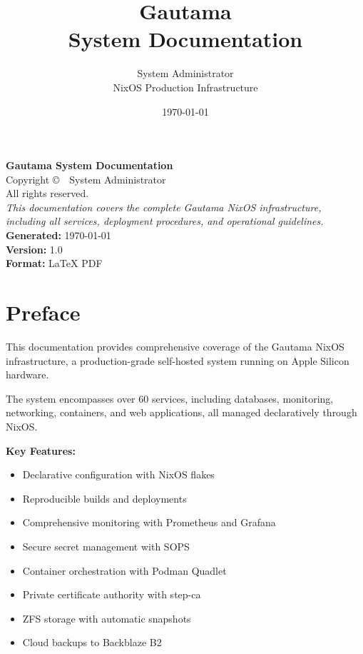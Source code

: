 \documentclass[11pt,a4paper,twoside,openright]{book}
\title{\Huge\bfseries Gautama\\System Documentation}
\author{%
    System Administrator\\[0.5cm]
    \large NixOS Production Infrastructure
}
\date{\today}
\begin{document}
\frontmatter

\maketitle

\newpage
\thispagestyle{empty}
\vspace*{\fill}
\begin{center}
    \textbf{Gautama System Documentation}\\[0.5cm]
    Copyright \copyright\ \the\year\ System Administrator\\[0.5cm]
    All rights reserved.\\[1cm]

    \textit{This documentation covers the complete Gautama NixOS infrastructure,\\
    including all services, deployment procedures, and operational guidelines.}\\[1cm]

    \textbf{Generated:} \today\\[0.5cm]
    \textbf{Version:} 1.0\\[0.5cm]
    \textbf{Format:} LaTeX PDF
\end{center}
\vspace*{\fill}

\tableofcontents

\listoffigures

\listoftables

\chapter*{Preface}

This documentation provides comprehensive coverage of the Gautama NixOS infrastructure,
a production-grade self-hosted system running on Apple Silicon hardware.

The system encompasses over 60 services, including databases, monitoring, networking,
containers, and web applications, all managed declaratively through NixOS.

\textbf{Key Features:}
\begin{itemize}
    \item Declarative configuration with NixOS flakes
    \item Reproducible builds and deployments
    \item Comprehensive monitoring with Prometheus and Grafana
    \item Secure secret management with SOPS
    \item Container orchestration with Podman Quadlet
    \item Private certificate authority with step-ca
    \item ZFS storage with automatic snapshots
    \item Cloud backups to Backblaze B2
\end{itemize}
\end{document}
